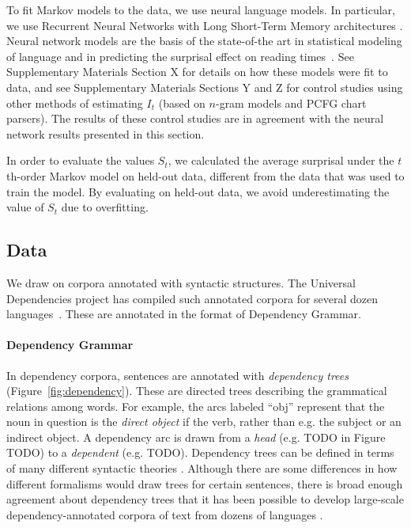 To fit Markov models to the data, we use neural language models. In particular, we use Recurrent Neural Networks with Long Short-Term Memory architectures \citep{hochreiter-long-1997}. 
Neural network models are the basis of the state-of-the art in statistical modeling of language and in predicting the surprisal effect on reading times~\citep{frank-insensitivity-2011,goodkind-predictive-2018}.
See Supplementary Materials Section X for details on how these models were fit to data, and see Supplementary Materials Sections Y and Z for control studies using other methods of estimating $I_t$ (based on $n$-gram models and PCFG chart parsers). The results of these control studies are in agreement with the neural network results presented in this section.

In order to evaluate the values $S_t$, we calculated the average surprisal under the $t$th-order Markov model on held-out data, different from the data that was used to train the model. By evaluating on held-out data, we avoid underestimating the value of $S_t$ due to overfitting.

\subsection{Data}
We draw on corpora annotated with syntactic structures.
The Universal Dependencies project has compiled such annotated corpora for several dozen languages~\citep{nivre-universal-2017}.
These are annotated in the format of Dependency Grammar.

\paragraph{Dependency Grammar}
In dependency corpora, sentences are annotated with \emph{dependency trees} (Figure~\ref{fig:dependency}).
These are directed trees describing the grammatical relations among words. For example, the arcs labeled ``obj'' represent that the noun in question is the \emph{direct object} if the verb, rather than e.g. the subject or an indirect object.
A dependency arc is drawn from a \emph{head} (e.g. TODO in Figure TODO) to a \emph{dependent} (e.g. TODO).
Dependency trees can be defined in terms of many different syntactic theories \citep{corbett1993heads}.
Although there are some differences in how different formalisms would draw trees for certain sentences, there is broad enough agreement about dependency trees that it has been possible to develop large-scale dependency-annotated corpora of text from dozens of languages \citep{nivre2017universal}.

